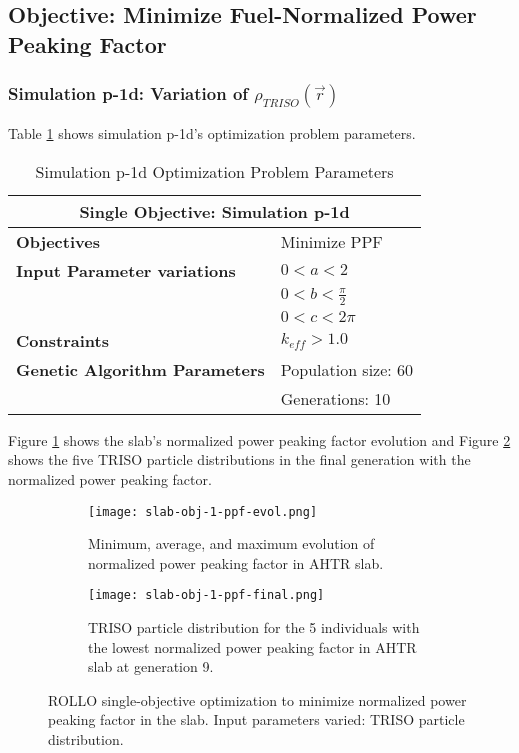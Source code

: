 \subsection{Objective: Minimize Fuel-Normalized Power Peaking Factor}

\subsubsection{Simulation p-1d: Variation of $\rho_{TRISO}(\vec{r})$}
Table \ref{tab:simulation1d} shows simulation p-1d's optimization problem parameters. 
\begin{table}[H]
    \centering
    \onehalfspacing
    \caption{Simulation p-1d Optimization Problem Parameters}
	\label{tab:simulation1d}
    \footnotesize
    \begin{tabular}{l|p{3cm}}
    \hline 
    \multicolumn{2}{c}{\textbf{Single Objective: Simulation p-1d}} \\
    \hline 
    \textbf{Objectives} & Minimize PPF \\
    \hline 
    \textbf{Input Parameter variations} & $0<a<2$ \\
    & $0<b<\frac{\pi}{2}$ \\
    & $0<c<2\pi$ \\
    \hline
    \textbf{Constraints} & $k_{eff} > 1.0$\\ 
    \hline 
    \textbf{Genetic Algorithm Parameters} & Population size: 60 \\
    & Generations: 10 \\
    \hline
    \end{tabular}
\end{table}
Figure \ref{fig:slab-obj-1-ppf-evol} shows the slab's normalized power peaking 
factor evolution and Figure \ref{fig:slab-obj-1-ppf-final} shows the five TRISO particle 
distributions in the final generation with the normalized power peaking factor.
\begin{figure}[htbp]
    \centering
    \begin{subfigure}{\textwidth}
        \texttt{[image: slab-obj-1-ppf-evol.png]}
        \caption{Minimum, average, and maximum evolution of normalized power 
        peaking factor in AHTR slab.}
        \label{fig:slab-obj-1-ppf-evol} 
    \end{subfigure}
    \begin{subfigure}{\textwidth}
        \texttt{[image: slab-obj-1-ppf-final.png]}
        \caption{TRISO particle distribution for the 5 individuals with the 
        lowest normalized power peaking factor in AHTR slab at generation 9.}
        \label{fig:slab-obj-1-ppf-final} 
    \end{subfigure}
    \caption{ROLLO single-objective optimization to minimize normalized power 
    peaking factor in the slab. Input parameters varied: TRISO particle distribution.}
    \label{fig:slab-obj-1-ppf}
\end{figure}
